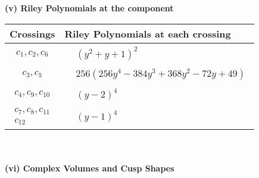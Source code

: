 \documentclass[1p]{elsarticle_modified}
\theoremstyle{definition}
\begin{document}
\newpage\renewcommand{\arraystretch}{1}
\flushleft \textbf{(v) Riley Polynomials at the component}\newline \\
\begin{tabular}{m{50pt}|m{274pt}}
Crossings & \hspace{64pt}Riley Polynomials at each crossing \\
\hline $$\begin{aligned}c_{1},c_{2},c_{6}\end{aligned}$$&$\begin{aligned}
&(y^2+y+1)^2
\end{aligned}$\\
\hline $$\begin{aligned}c_{3},c_{5}\end{aligned}$$&$\begin{aligned}
&256(256 y^4-384 y^3+368 y^2-72 y+49)
\end{aligned}$\\
\hline $$\begin{aligned}c_{4},c_{9},c_{10}\end{aligned}$$&$\begin{aligned}
&(y-2)^4
\end{aligned}$\\
\hline $$\begin{aligned}c_{7},c_{8},c_{11}\\c_{12}\end{aligned}$$&$\begin{aligned}
&(y-1)^4
\end{aligned}$\\
\hline
\end{tabular}\\~\\
\newpage\flushleft \textbf{(vi) Complex Volumes and Cusp Shapes}
\end{document}
